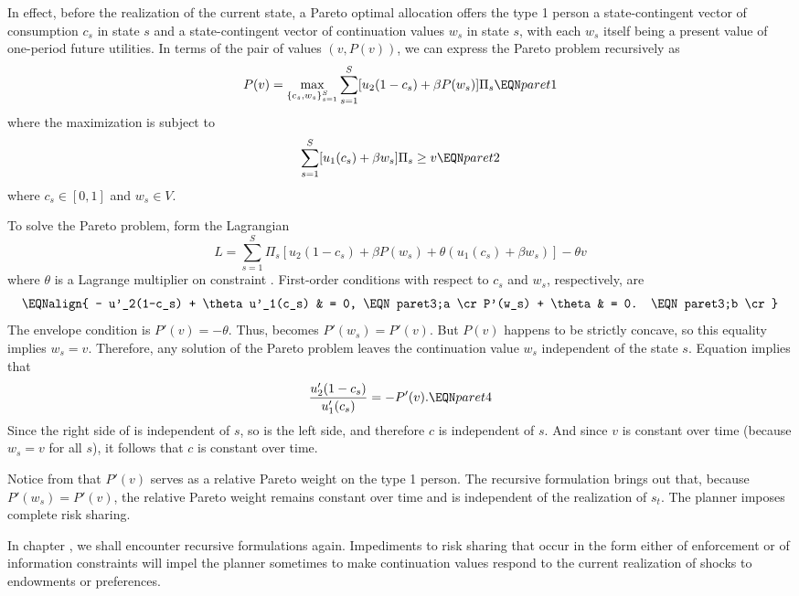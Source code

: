 In effect, before the realization of the current state, a Pareto optimal
allocation offers the type 1 person a state-contingent vector of
consumption $c_s$ in state $s$ and
a state-contingent vector of continuation values
$w_s$ in state $s$, with each $w_s$ itself being a present value
of one-period future utilities.
In terms of the pair of values
$(v, P(v))$,
 we can express the Pareto problem recursively as
$$ P(v) = \max_{\{c_s, w_s \}_{s=1}^S }
  \sum_{s=1}^S [ u_2(1-c_s) + \beta P(w_s)] \Pi_s  \EQN paret1 $$
where the maximization is subject to
$$ \sum_{s=1}^S [u_1(c_s) + \beta w_s ] \Pi_s \geq v \EQN paret2 $$
where $c_s \in [0,1]$ and $w_s \in V$.


To solve the Pareto problem, form the
Lagrangian
$$ L = \sum_{s=1}^S \Pi_s [u_2(1-c_s) + \beta P(w_s)
   + \theta (u_1(c_s) + \beta w_s) ] - \theta v $$
where $\theta $ is a Lagrange multiplier on constraint .
First-order conditions
with respect to $c_s$ and $w_s$, respectively, are
$$\EQNalign{ - u'_2(1-c_s) + \theta u'_1(c_s) & = 0, \EQN paret3;a \cr
        P'(w_s) + \theta & = 0. \EQN paret3;b \cr} $$
The envelope condition is
$ P'(v) = -\theta$.  Thus,  becomes
$  P'(w_s) = P'(v)   $.  But $P(v)$ happens to be strictly concave,
so  this equality implies
$ w_s = v$.  Therefore,  any solution of the Pareto problem leaves
the continuation value $w_s$ independent  of  the state $s$.
Equation
 implies that
$${u'_2(1-c_s) \over u'_1(c_s)} = -P' (v) .\EQN paret4 $$
Since the right side of  is independent of $s$, so is
the left side, and therefore $c$ is independent of $s$.
  And since $v$ is constant over time (because $w_s = v$ for all $s$),
it follows that $c$ is constant over time.


 Notice from
 that $P'(v)$ serves as a   relative Pareto weight on
the type 1 person. The recursive formulation brings out that,
because $P'(w_s) = P'(v)$,
 the relative  Pareto weight remains constant over time and is independent
of the  realization of $s_t$.    The planner imposes
complete risk sharing.


In chapter , we shall encounter recursive formulations
again. Impediments to risk sharing that occur in the form
either of enforcement or of information constraints will
impel the planner sometimes to make continuation values respond
to the current realization of shocks to endowments or preferences.




